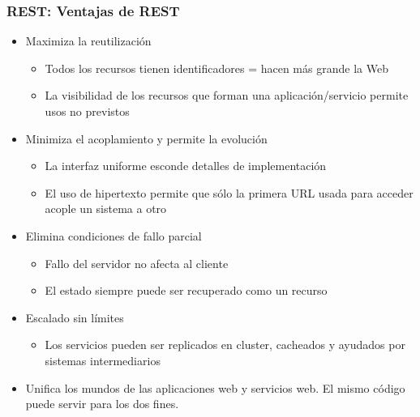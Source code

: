 \begin{frame}
\frametitle{REST: Ventajas de REST}

\begin{itemize}
\item Maximiza la reutilización
  \begin{itemize}
  \item Todos los recursos tienen identificadores = hacen más grande la Web
  \item La visibilidad de los recursos que forman una aplicación/servicio permite usos no previstos
  \end{itemize}
\item Minimiza el acoplamiento y permite la evolución
  \begin{itemize}
  \item La interfaz uniforme esconde detalles de implementación
  \item El uso de hipertexto permite que sólo la primera URL usada para acceder acople un sistema a otro
  \end{itemize}
\item Elimina condiciones de fallo parcial
  \begin{itemize}
  \item Fallo del servidor no afecta al cliente
  \item El estado siempre puede ser recuperado como un recurso
  \end{itemize}
\item Escalado sin límites
  \begin{itemize}
  \item Los servicios pueden ser replicados en cluster, cacheados y ayudados por sistemas intermediarios
  \end{itemize}
\item Unifica los mundos de las aplicaciones web y servicios web. El mismo código puede servir para los dos fines.
\end{itemize}

\end{frame}

